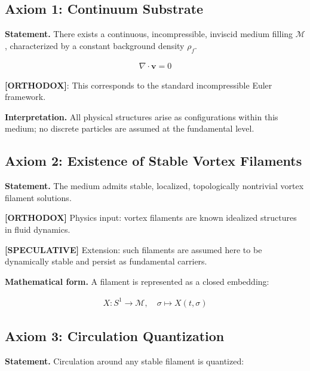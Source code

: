 \documentclass[11pt]{article}
\theoremstyle{definition}
\theoremstyle{plain}
\theoremstyle{remark}
\newcommand{\rhoF}{{\rho_{\!f}}}
\begin{document}
    \subsection{Axiom 1: Continuum Substrate}
        
        \textbf{Statement.}
        There exists a continuous, incompressible, inviscid medium filling $\mathcal{M}$, characterized by a constant background density $\rhoF$.
        
        \begin{align}
            \nabla \cdot \mathbf{v} = 0
        \end{align}
        
        \textbf{[ORTHODOX]}: This corresponds to the standard incompressible Euler framework.
        
        \textbf{Interpretation.}
        All physical structures arise as configurations within this medium; no discrete particles are assumed at the fundamental level.
    
    \subsection{Axiom 2: Existence of Stable Vortex Filaments}
        
        \textbf{Statement.}
        The medium admits stable, localized, topologically nontrivial vortex filament solutions.
        
        \textbf{[ORTHODOX]} Physics input: vortex filaments are known idealized structures in fluid dynamics.

        \textbf{[SPECULATIVE]} Extension: such filaments are assumed here to be dynamically stable and persist as fundamental carriers.
        
        \textbf{Mathematical form.}
        A filament is represented as a closed embedding:
        
        \begin{align}
            X: S^1 \to \mathcal{M}, \quad \sigma \mapsto X(t,\sigma)
        \end{align}
    
    \subsection{Axiom 3: Circulation Quantization}
        
        \textbf{Statement.}
        Circulation around any stable filament is quantized:
        
\end{document}
